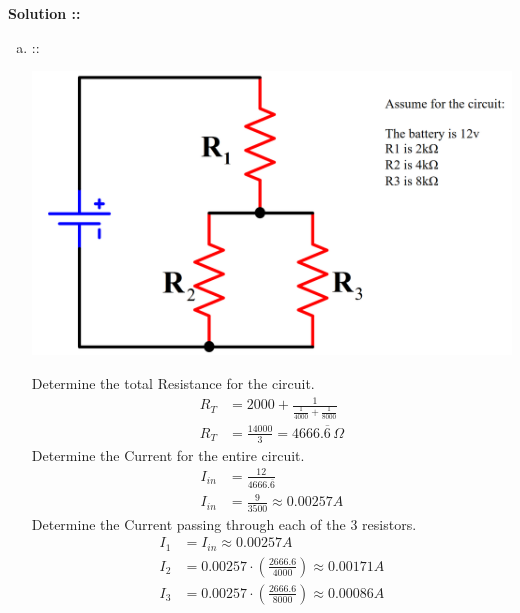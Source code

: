 \documentclass[11pt]{article}
\begin{document}
\vspace{5px}\textbf{Solution ::}
\begin{enumerate}[a)]
\item ::
\begin{center}
    \includegraphics[scale=0.2]{4a.png}
\end{center}
Determine the total Resistance for the circuit.
\begin{align*}
    R_T &= 2000 + \frac{1}{\frac{1}{4000}+\frac{1}{8000}} \\
    R_T &= \frac{14000}{3} = 4666.\overline{6}\,\Omega
\end{align*}
Determine the Current for the entire circuit.
\begin{align*}
    I_{in} &= \frac{12}{4666.\overline{6}} \\
    I_{in} &= \frac{9}{3500} \approx 0.00257A
\end{align*}
Determine the Current passing through each of the 3 resistors.
\begin{align*}
    I_1 &= I_{in} \approx 0.00257A \\
    I_2 &= 0.00257\cdot\left(\frac{2666.6}{4000}\right) \approx 0.00171A \\
    I_3 &= 0.00257\cdot\left(\frac{2666.6}{8000}\right) \approx 0.00086 A
\end{align*}


\end{enumerate}
\end{document}
